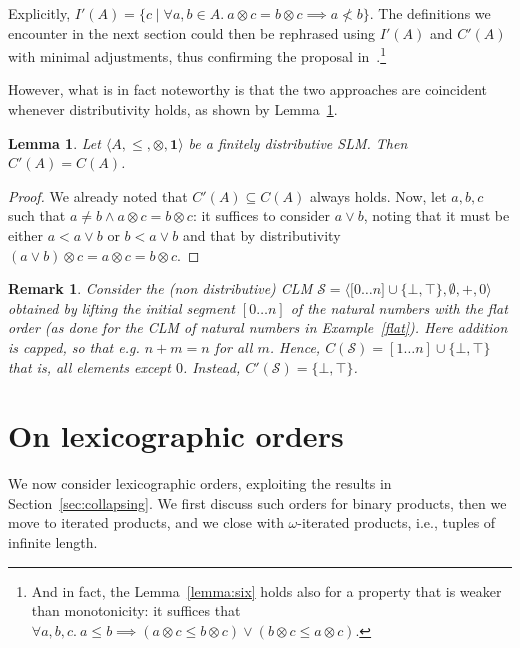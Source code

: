\documentclass[a4paper]{elsarticle}
\newtheorem{remark}{Remark}
\newtheorem{lemma}{Lemma}
\newcommand{\monop}{\otimes}
\newcommand{\1}{\mathbf{1}}
\begin{document}
Explicitly, $I'(A) = \{ c \mid \forall a, b \in A.\ a \otimes c = b \otimes c \implies a \not < b \}$.
%
The definitions we encounter in the next section 
could then be rephrased using 
$I'(A)$ and $C'(A)$ with minimal adjustments, thus confirming the proposal
in~\cite{GadducciHMW13}.\footnote{And in fact, the Lemma~\ref{lemma:six} holds also for 
	a property that is weaker than monotonicity: it suffices that 
	$\forall a, b, c.\ a \leq b \implies (a \otimes c \leq b \otimes c) \vee (b \otimes c \leq a \otimes c)$.
}

However, what is in fact noteworthy is that the two approaches are coincident
whenever distributivity holds, as shown by  Lemma~\ref{lemma:seven}.

\begin{lemma}\label{lemma:seven}
	Let $\langle A, \leq, \monop, \1 \rangle$ be a finitely distributive SLM.
	Then $C'(A) = C(A)$.
\end{lemma}
\begin{proof}
	We already noted that $C'(A) \subseteq C(A)$ always holds. Now, let $a, b, c$ such that
	$a \neq b \wedge a \otimes c = b \otimes c$: it suffices to consider $a \vee b$, noting 
	that it must be either $a < a \vee b$ or $b < a \vee b$ and that by distributivity 
	$(a \vee b) \otimes c = a \otimes c = b \otimes c$.
\end{proof}

\begin{remark}
	Consider the (non distributive) CLM $\mathcal{S} = \langle \mathbb [0 \ldots n] \cup \{\bot,\top\}, \emptyset, +, 0 \rangle$ 
	obtained by lifting the initial segment $[0 \ldots n]$ of the natural numbers with the flat order (as done for
	the CLM of natural numbers in Example~\ref{flat}). Here addition is capped, so that 
	e.g. $n + m = n$ for all $m$. Hence, $C(\mathcal{S}) = [1 \ldots n] \cup \{\bot,\top\}$
	that is, all elements except $0$. Instead, $C'(\mathcal{S}) =  \{\bot,\top\}$.
\end{remark}

\section{On lexicographic orders}\label{sec:lexico}
We now consider lexicographic orders, exploiting the results in Section~\ref{sec:collapsing}.
%
We first discuss such orders for binary products, then we move to iterated products, 
and we close with $\omega$-iterated products, i.e., tuples of infinite length.
\end{document}
